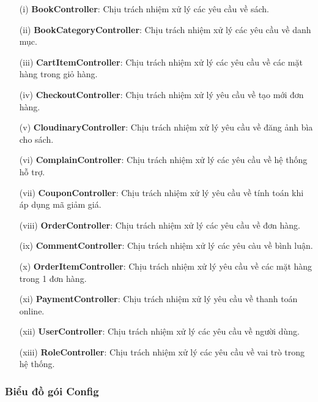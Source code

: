 \documentclass[../DoAn.tex]{subfiles}
\begin{document}
\begin{enumerate}
    \item [(i)] \textbf{BookController}: Chịu trách nhiệm xử lý các yêu cầu về sách.
    \item [(ii)]\textbf{BookCategoryController}: Chịu trách nhiệm xử lý các yêu cầu về danh mục.
    \item[(iii)] \textbf{CartItemController}: Chịu trách nhiệm xử lý các yêu cầu về các mặt hàng trong giỏ hàng.
    \item[(iv)] \textbf{CheckoutController}: Chịu trách nhiệm xử lý yêu cầu về tạo mới đơn hàng.
    \item[(v)] \textbf{CloudinaryController}: Chịu trách nhiệm xử lý yêu cầu về đăng ảnh bìa cho sách.
    \item[(vi)] \textbf{ComplainController}: Chịu trách nhiệm xử lý các yêu cầu về hệ thống hỗ trợ.
    \item[(vii)] \textbf{CouponController}: Chịu trách nhiệm xử lý yêu cầu về tính toán khi áp dụng mã giảm giá.
    \item[(viii)] \textbf{OrderController}: Chịu trách nhiệm xử lý các yêu cầu về đơn hàng.
    \item[(ix)] \textbf{CommentController}: Chịu trách nhiệm xử lý các yêu càu về bình luận.
    \item[(x)] \textbf{OrderItemController}: Chịu trách nhiệm xử lý yêu cầu về các mặt hàng trong 1 đơn hàng.
    \item[(xi)] \textbf{PaymentController}: Chịu trách nhiệm xử lý yêu cầu về thanh toán online.
    \item[(xii)] \textbf{UserController}: Chịu trách nhiệm xử lý các yêu cầu về người dùng.
    \item[(xiii)] \textbf{RoleController}: Chịu trách nhiệm xử lý các yêu cầu về vai trò trong hệ thống.  
\end{enumerate}

\subsubsection{Biểu đồ gói Config}
\end{document}
